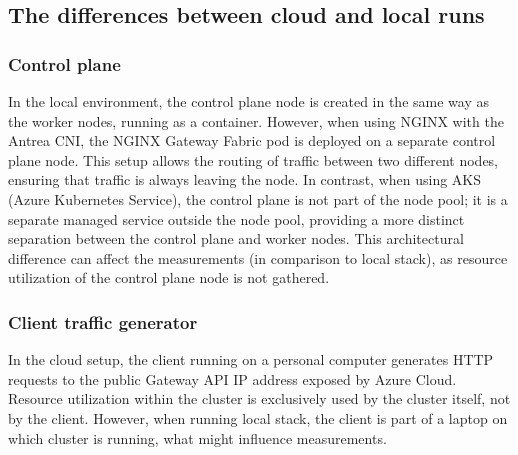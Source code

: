 \subsection{The differences between cloud and local runs}
\label{sec:diff}

\subsubsection{Control plane}
\label{sec:cplaneDiff}

In the local environment, the control plane node is created in the same way as the worker nodes, running as a container. However, when using NGINX with the Antrea CNI, the NGINX Gateway Fabric pod is deployed on a separate control plane node. This setup allows the routing of traffic between two different nodes, ensuring that traffic is always leaving the node. In contrast, when using AKS (Azure Kubernetes Service), the control plane is not part of the node pool; it is a separate managed service outside the node pool, providing a more distinct separation between the control plane and worker nodes. This architectural difference can affect the measurements (in comparison to local stack), as resource utilization of the control plane node is not gathered.

\subsubsection{Client traffic generator}
\label{sec:clientServerDiff}

In the cloud setup, the client running on a personal computer generates HTTP requests to the public Gateway API IP address exposed by Azure Cloud. Resource utilization within the cluster is exclusively used by the cluster itself, not by the client. However, when running local stack, the client is part of a laptop on which cluster is running, what might influence measurements.
